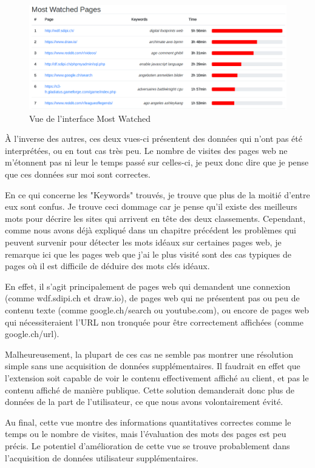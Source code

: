 		\begin{figure}[!h]
			\centering
			\includegraphics[width=1\textwidth]{images/results/critique-mostwatched}
			\caption{Vue de l'interface Most Watched}
			\label{critique-watched}
		\end{figure}

		À l'inverse des autres, ces deux vues-ci présentent des données qui n'ont pas été interprétées, ou en tout cas très peu. Le nombre de visites des pages web ne m'étonnent pas ni leur le temps passé sur celles-ci, je peux donc dire que je pense que ces données sur moi sont correctes.

		En ce qui concerne les "Keywords" trouvés, je trouve que plus de la moitié d'entre eux sont confus. Je trouve ceci dommage car je pense qu'il existe des meilleurs mots pour décrire les sites qui arrivent en tête des deux classements. Cependant, comme nous avons déjà expliqué dans un chapitre précédent les problèmes qui peuvent survenir pour détecter les mots idéaux sur certaines pages web, je remarque ici que les pages web que j'ai le plus visité sont des cas typiques de pages où il est difficile de déduire des mots clés idéaux.

		En effet, il s'agit principalement de pages web qui demandent une connexion (comme wdf.sdipi.ch et draw.io), de pages web qui ne présentent pas ou peu de contenu texte (comme google.ch/search ou youtube.com), ou encore de pages web qui nécessiteraient l'URL non tronquée pour être correctement affichées (comme google.ch/url).

		Malheureusement, la plupart de ces cas ne semble pas montrer une résolution simple sans une acquisition de données supplémentaires. Il faudrait en effet que l'extension soit capable de voir le contenu effectivement affiché au client, et pas le contenu affiché de manière publique. Cette solution demanderait donc plus de données de la part de l'utilisateur, ce que nous avons volontairement évité.

		Au final, cette vue montre des informations quantitatives correctes comme le temps ou le nombre de visites, mais l'évaluation des mots des pages est peu précis. Le potentiel d'amélioration de cette vue se trouve probablement dans l'acquisition de données utilisateur supplémentaires.

